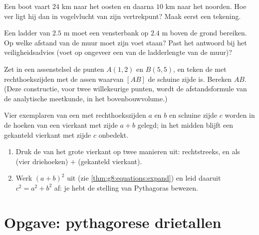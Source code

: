 \begin{exercise}[$\star\star$]\label{exo:g8:pythagoras:8}
Een boot vaart $24$ km naar het oosten en daarna $10$ km naar het noorden. Hoe
ver ligt hij dan in vogelvlucht van zijn vertrekpunt? Maak eerst een tekening.
\end{exercise}

\begin{exercise}[$\star\star$]\label{exo:g8:pythagoras:9}
Een ladder van $2.5$ m moet een vensterbank op $2.4$ m boven de grond bereiken.
Op welke afstand van de muur moet zijn voet staan? Past het antwoord bij het
veiligheidsadvies (voet op ongeveer een  van de ladderlengte van de muur)?
\end{exercise}

\begin{exercise}[$\star\star$]\label{exo:g8:pythagoras:10}
Zet in een assenstelsel de punten $A(1, 2)$ en $B(5, 5)$, en teken de
 met rechthoekszijden  met de assen waarvan $[AB]$
de schuine zijde is. Bereken $AB$. (Deze constructie, voor twee willekeurige
punten, wordt de afstandsformule van de analytische meetkunde, in het
bovenbouwvolume.)
\end{exercise}

\begin{exercise}[$\star\star\star$]\label{exo:g8:pythagoras:11}
Vier exemplaren van een  met rechthoekszijden $a$ en $b$ en
schuine zijde $c$ worden in de hoeken van een vierkant met zijde $a + b$ gelegd;
in het midden blijft een gekanteld vierkant met zijde $c$ onbedekt.
\begin{enumerate}
  \item Druk de  van het grote vierkant op twee manieren uit:
        rechtstreeks, en als (vier driehoeken) $+$ (gekanteld vierkant).
  \item Werk $(a + b)^2$ uit (zie \cref{thm:g8:equations:expand}) en leid daaruit
        $c^2 = a^2 + b^2$ af: je hebt de stelling van Pythagoras bewezen.
\end{enumerate}
\end{exercise}

\section{Opgave: pythagorese drietallen}

